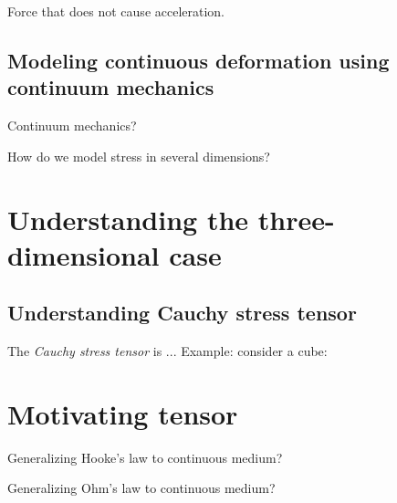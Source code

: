 Force that does not cause acceleration.

\subsection{Modeling continuous deformation using continuum mechanics}

Continuum mechanics?

How do we model stress in several dimensions?

\section{Understanding the three-dimensional case}

\subsection{Understanding Cauchy stress tensor}

The \emph{Cauchy stress tensor} is ...
Example: consider a cube:


\section{Motivating tensor}

Generalizing Hooke's law to continuous medium?

Generalizing Ohm's law to continuous medium?

